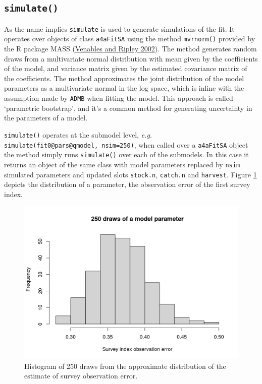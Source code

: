 \documentclass[
]{book}
\begin{document}
\hypertarget{simulate}{%
\subsection{\texorpdfstring{\texttt{simulate()}}{simulate()}}\label{simulate}}

As the name implies \texttt{simulate} is used to generate simulations of the fit. It operates over objects of class \texttt{a4aFitSA} using the method \texttt{mvrnorm()} provided by the R package MASS (\protect\hyperlink{ref-mass}{Venables and Ripley 2002}). The method generates random draws from a multivariate normal distribution with mean given by the coefficients of the model, and variance matrix given by the estimated covariance matrix of the coefficients. The method approximates the joint distribution of the model parameters as a multivariate normal in the log space, which is inline with the assumption made by \texttt{ADMB} when fitting the model. This approach is called `parametric bootstrap', and it's a common method for generating uncertainty in the parameters of a model.

\texttt{simulate()} operates at the submodel level, \emph{e.g.} \texttt{simulate(fit0@pars@qmodel,\ nsim=250)}, when called over a \texttt{a4aFitSA} object the method simply runs \texttt{simulate()} over each of the submodels. In this case it returns an object of the same class with model parameters replaced by \texttt{nsim} simulated parameters and updated slots \texttt{stock.n}, \texttt{catch.n} and \texttt{harvest}. Figure \ref{fig:predsimhist} depicts the distribution of a parameter, the observation error of the first survey index.

\begin{figure}
\centering
\includegraphics{_bookdown_files/_main_files/figure-html/predsimhist-1.png}
\caption{\label{fig:predsimhist}Histogram of 250 draws from the approximate distribution of the estimate of survey observation error.}
\end{figure}
\end{document}
